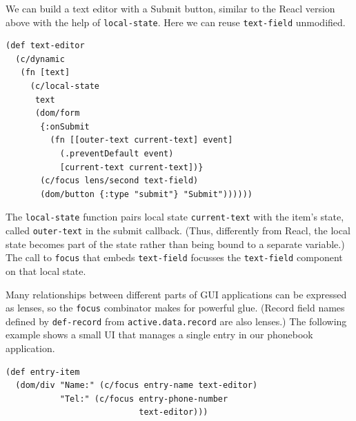 \documentclass[sigplan,review,screen]{acmart}
\begin{document}
We can build a text editor with a Submit button, similar to the Reacl
version above with the help of \texttt{local-state}. Here we can reuse
\texttt{text-field} unmodified.
%
\begin{verbatim}
(def text-editor
  (c/dynamic
   (fn [text]
     (c/local-state
      text
      (dom/form
       {:onSubmit
         (fn [[outer-text current-text] event]
           (.preventDefault event)
           [current-text current-text])}
       (c/focus lens/second text-field)
       (dom/button {:type "submit"} "Submit"))))))
\end{verbatim}
%
The \texttt{local-state} function pairs local state \texttt{current-text}
with the item's state, called \texttt{outer-text} in the submit
callback.  (Thus, differently from Reacl, the local state becomes part
of the state rather than being bound to a separate variable.)  The
call to \texttt{focus} that embeds \texttt{text-field} focusses the
\texttt{text-field} component on that local state.
%
\begin{center}
\end{center}
%
Many relationships between different parts of GUI applications can be
expressed as lenses, so the \texttt{focus} combinator makes for 
powerful glue.  (Record field names defined by \texttt{def-record} from
\texttt{active.data.record} are also lenses.) The following
example shows a small UI that manages a single entry in our phonebook
application.
%
\begin{verbatim}
(def entry-item
  (dom/div "Name:" (c/focus entry-name text-editor)
           "Tel:" (c/focus entry-phone-number
                           text-editor)))
\end{verbatim}
%
\begin{center}
\end{center}
\end{document}
